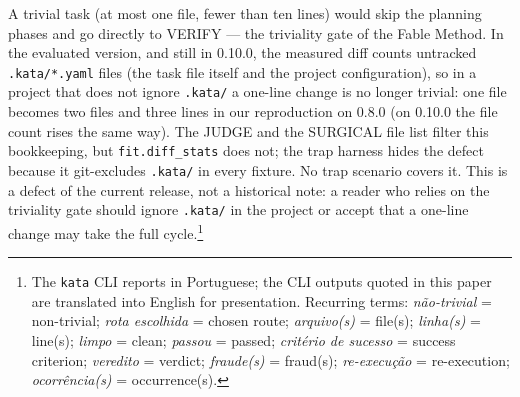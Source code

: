 \documentclass{sbc2019}%
\begin{document}
A trivial task (at most one file, fewer than ten lines) would skip the
planning phases and go directly to VERIFY --- the triviality gate of the
Fable Method. In the evaluated version, and still in 0.10.0, the measured diff
counts untracked \texttt{.kata/*.yaml} files (the task file itself and the
project configuration), so in a project that does not ignore \texttt{.kata/}
a one-line change is no longer trivial: one file becomes two files and three
lines in our reproduction on 0.8.0 (on 0.10.0 the file count rises the same way). The JUDGE and the SURGICAL file list
filter this bookkeeping, but \texttt{fit.diff\_stats} does not; the trap
harness hides the defect because it git-excludes \texttt{.kata/} in every
fixture. No trap scenario covers it. This is a
defect of the current release, not a historical note: a reader who relies on
the triviality gate should ignore \texttt{.kata/} in the project or accept
that a one-line change may take the full cycle.\footnote{The \texttt{kata} CLI reports in Portuguese; the
CLI outputs quoted in this paper are translated into English for
presentation. Recurring terms: \emph{não-trivial} = non-trivial;
\emph{rota escolhida} = chosen route; \emph{arquivo(s)} = file(s);
\emph{linha(s)} = line(s); \emph{limpo} = clean; \emph{passou} = passed;
\emph{critério de sucesso} = success criterion; \emph{veredito} = verdict;
\emph{fraude(s)} = fraud(s); \emph{re-execução} = re-execution;
\emph{ocorrência(s)} = occurrence(s).}
\end{document}
